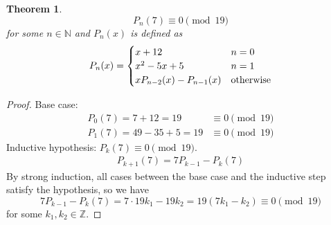 \documentclass{article}
\newtheorem{theorem}{Theorem}
\newcommand{\N}{\mathbb{N}}
\newcommand{\Z}{\mathbb{Z}}
\begin{document}
\begin{theorem}
    \begin{equation}
        P_n(7) \equiv 0 \pmod{19}
    \end{equation}
    for some \(n \in \N\) and \(P_n(x)\) is defined as
    \begin{equation}
        P_n(x) =
        \begin{cases}
            x + 12 & n = 0 \\
            x^2 - 5x + 5 & n = 1 \\
            x P_{n - 2}(x) - P_{n - 1}(x) & \textnormal{otherwise}
        \end{cases}
    \end{equation}
\end{theorem}
\begin{proof}
    Base case:
    \begin{align}
        P_0(7) = 7 + 12 = 19 &\equiv 0 \pmod{19} \\
        P_1(7) = 49 - 35 + 5 = 19 &\equiv 0 \pmod{19}
    \end{align}
    Inductive hypothesis: \(P_k(7) \equiv 0 \pmod{19}\).
    \begin{align}
        P_{k + 1}(7) = 7P_{k - 1} - P_k(7)
    \end{align}
    By strong induction, all cases between the base case and the inductive step satisfy the hypothesis, so we have
    \begin{equation}
        7P_{k - 1} - P_k(7) = 7 \cdot 19k_1 - 19k_2 = 19(7k_1 - k_2) \equiv 0 \pmod{19}
    \end{equation}
    for some \(k_1, k_2 \in \Z\).
\end{proof}

\subsection{}
\end{document}
